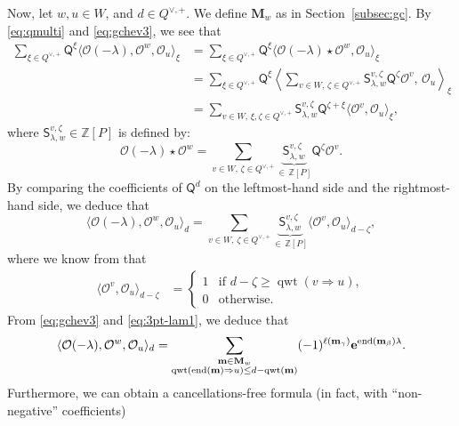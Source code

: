 \documentclass[11pt,a4paper,reqno,dvipdfmx]{amsart}
\numberwithin{equation}{section}
\newcommand{\BZ}{\mathbb{Z}}
\newcommand{\CO}{\mathcal{O}}
\newcommand{\sQ}{\mathsf{Q}}
\newcommand{\sS}{\mathsf{S}}
\newcommand{\be}{\mathbf{e}}
\newcommand{\bm}{\mathbf{m}}
\newcommand{\bM}{\mathbf{M}}
\DeclareMathOperator{\qwt}{qwt}
\DeclareMathOperator{\ed}{end}
\newcommand{\twp}[2]{ \langle \CO^{#1}, \CO_{#2} \rangle }
\theoremstyle{plain}
\theoremstyle{definition}
\theoremstyle{remark}
\begin{document}
Now, let $w,u \in W$, and $d \in Q^{\vee,+}$. We define $\bM_{w}$ as in Section~\ref{subsec:gc}. 
By \eqref{eq:qmulti} and \eqref{eq:gchev3}, we see that 
%
\begin{align*}
\sum_{\xi \in Q^{\vee,+}}
\sQ^{\xi} \langle \CO(- \lambda),\CO^{w},\CO_{u} \rangle_{\xi} & = 
\sum_{\xi \in Q^{\vee,+}}
\sQ^{\xi} \langle \CO(- \lambda) \star \CO^{w},\CO_{u} \rangle_{\xi} \\
%
& = 
\sum_{\xi \in Q^{\vee,+}}
\sQ^{\xi} \left \langle 
\sum_{ v \in W,\,\zeta \in Q^{\vee,+} } 
\sS_{\lambda,w}^{v,\zeta} \sQ^{\zeta} \CO^{v},\,\CO_{u} \right\rangle_{\xi} \\
%
& = \sum_{v \in W,\,\xi,\zeta \in Q^{\vee,+}}
\sS_{\lambda,w}^{v,\zeta} \sQ^{\zeta+\xi} \twp{v}{u}_{\xi},
\end{align*}
%
where $\sS_{\lambda,w}^{v,\zeta} \in \BZ[P]$ is defined by: 
%
\begin{equation*}
\CO(- \lambda) \star \CO^{w} = \sum_{v \in W,\,\zeta \in Q^{\vee,+} }
\underbrace{ \sS_{\lambda,w}^{v,\zeta} }_{\in \, \BZ[P]} \sQ^{\zeta} \CO^{v}. 
\end{equation*}
%
By comparing the coefficients of $\sQ^{d}$ 
on the leftmost-hand side and the rightmost-hand side, we deduce that 
%
\begin{equation} \label{eq:3pt-lam1}
\langle \CO(- \lambda),\CO^{w},\CO_{u} \rangle_{d} = 
\sum_{v \in W,\, \zeta \in Q^{\vee,+} }
\underbrace{ \sS_{\lambda,w}^{v,\zeta} }_{\in \, \BZ[P]} \twp{v}{u}_{d-\zeta}, 
\end{equation}
%
where we know from \cite[Lemma~4.1]{LNSX} that 
%
\begin{align*}
\twp{v}{u}_{d-\zeta} & = 
 \begin{cases}
 1 & \text{if $d-\zeta \ge \qwt(v \Rightarrow u)$}, \\
 0 & \text{otherwise}.
 \end{cases}
\end{align*}
%
From \eqref{eq:gchev3} and \eqref{eq:3pt-lam1}, we deduce that 
%
\begin{equation} \label{eq:3pt-lam2}
\langle \CO(- \lambda),\CO^{w},\CO_{u} \rangle_{d} = 
\sum_{ 
  \begin{subarray}{c} 
  \bm \in \bM_{w} \\
  \qwt(\ed(\bm) \Rightarrow u) \le d - \qwt(\bm)
  \end{subarray} } (-1)^{\ell(\bm_{\gamma})} \be^{\ed(\bm_{\beta})\lambda}. 
\end{equation}
%
Furthermore, we can obtain a cancellations-free formula (in fact, with ``non-negative'' coefficients) 
\end{document}
